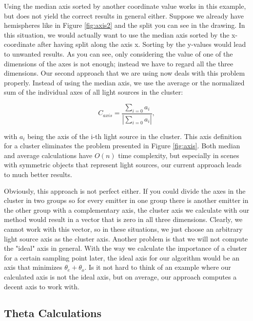 Using the median axis sorted by another coordinate value works in this example, but does not yield the correct results in general either. Suppose we already have hemispheres like in Figure \ref{fig:axis2} and the split you can see in the drawing. In this situation, we would actually want to use the median axis sorted by the x-coordinate after having split along the axis x. Sorting by the y-values would lead to unwanted results. As you can see, only considering the value of one of the dimensions of the axes is not enough; instead we have to regard all the three dimensions. Our second approach that we are using now deals with this problem properly. Instead of using the median axis, we use the average or the normalized sum of the individual axes of all light sources in the cluster:

\begin{equation}
C_{axis} = \frac{\sum_{i = 0} a_i}{|\sum_{i = 0} a_i|},
\end{equation}

with $a_i$ being the axis of the i-th light source in the cluster. This axis definition for a cluster eliminates the problem presented in Figure \ref{fig:axis}. Both median and average calculations have $O(n)$ time complexity, but especially in scenes with symmetric objects that represent light sources, our current approach leads to much better results.

Obviously, this approach is not perfect either. If you could divide the axes in the cluster in two groups so for every emitter in one group there is another emitter in the other group with a complementary axis, the cluster axis we calculate with our method would result in a vector that is zero in all three dimensions. Clearly, we cannot work with this vector, so in these situations, we just choose an arbitrary light source axis as the cluster axis. Another problem is that we will not compute the "ideal" axis in general. With the way we calculate the importance of a cluster for a certain sampling point later, the ideal axis for our algorithm would be an axis that minimizes $\theta_e + \theta_o$. Is it not hard to think of an example where our calculated axis is not the ideal axis, but on average, our approach computes a decent axis to work with.

\subsection{Theta Calculations}
\label{subs:theta}

